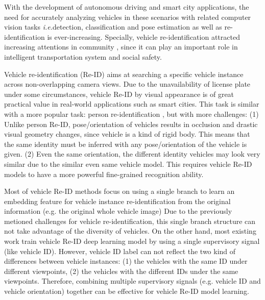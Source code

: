 \documentclass[10pt,twocolumn,letterpaper]{article}
\def\ie{\emph{i.e.\hspace{0.3em}}}
\begin{document}

With the development of autonomous driving
and smart city applications, the need for accurately analyzing vehicles in these
scenarios with related computer vision tasks \ie detection, classification and
pose estimation as well as re-identification is ever-increasing.
%
Specially, vehicle re-identification attracted increasing attentions in community
\cite{liu2016vehicleid,liu2016veri,liu2016veri,
wang2017orientation,Wang_2017_ICCV,Zhou2018VAMI},
since it can play an important role in
intelligent transportation system and social safety.

Vehicle re-identification (Re-ID) aims at searching a specific vehicle
instance across non-overlapping camera views.
%
Due to the unavailability of license plate under some circumstances,
vehicle Re-ID by visual appearance is of great practical value in real-world applications such as smart cities.
%
This task is similar with a more popular task: person re-identification
\cite{gong2014re,chen2018person,Li2018Harmonious,xiao2016learning,
li2017person,wei2018person,song2018mask,chang2018multi,
shen2018deep,zhang2017deep,shen2018person,suh2018part},
but with more challenges:
(1) Unlike person Re-ID, pose/orientation of vehicles results in occlusion and drastic visual geometry changes, since vehicle is a kind of rigid body.
This means that the same identity must be inferred with any pose/orientation of the vehicle is given.
(2) Even the same orientation, the different identity vehicles may look very similar
due to the similar even same vehicle model. This requires vehicle Re-ID models
to have a more powerful fine-grained recognition ability.

Most of vehicle Re-ID methods \cite{liu2016vehicleid,liu2016veri,Shen_2017_ICCV,Zhou2018VAMI}
focus on using a single branch
to learn an embedding feature for vehicle instance re-identification
from the original information (e.g. the original whole vehicle image)
%
Due to the previously metioned challenges for vehicle re-identification,
this single branch structure can not take advantage of the diversity of vehicles.
%
On the other hand, most existing work
\cite{liu2016vehicleid,liu2016veri}
train vehicle Re-ID deep learning model
by using a single supervisory signal (like vehicle ID).
%
However, vehicle ID label can not reflect the two kind of differences between vehicle instances:
(1) the vehicles with the same ID under different viewpoints,
(2) the vehicles with the different IDs under the same viewpoints.
Therefore, combining multiple supervisory signals (e.g. vehicle ID and vehicle orientation) together can be effective for vehicle Re-ID model learning.
\end{document}
